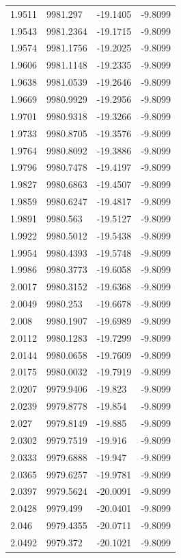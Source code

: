 \begin{table}[H]
\begin{tabular}{llll}
1.9511 & 9981.297 & -19.1405 & -9.8099 \\
1.9543 & 9981.2364 & -19.1715 & -9.8099 \\
1.9574 & 9981.1756 & -19.2025 & -9.8099 \\
1.9606 & 9981.1148 & -19.2335 & -9.8099 \\
1.9638 & 9981.0539 & -19.2646 & -9.8099 \\
1.9669 & 9980.9929 & -19.2956 & -9.8099 \\
1.9701 & 9980.9318 & -19.3266 & -9.8099 \\
1.9733 & 9980.8705 & -19.3576 & -9.8099 \\
1.9764 & 9980.8092 & -19.3886 & -9.8099 \\
1.9796 & 9980.7478 & -19.4197 & -9.8099 \\
1.9827 & 9980.6863 & -19.4507 & -9.8099 \\
1.9859 & 9980.6247 & -19.4817 & -9.8099 \\
1.9891 & 9980.563 & -19.5127 & -9.8099 \\
1.9922 & 9980.5012 & -19.5438 & -9.8099 \\
1.9954 & 9980.4393 & -19.5748 & -9.8099 \\
1.9986 & 9980.3773 & -19.6058 & -9.8099 \\
2.0017 & 9980.3152 & -19.6368 & -9.8099 \\
2.0049 & 9980.253 & -19.6678 & -9.8099 \\
2.008 & 9980.1907 & -19.6989 & -9.8099 \\
2.0112 & 9980.1283 & -19.7299 & -9.8099 \\
2.0144 & 9980.0658 & -19.7609 & -9.8099 \\
2.0175 & 9980.0032 & -19.7919 & -9.8099 \\
2.0207 & 9979.9406 & -19.823 & -9.8099 \\
2.0239 & 9979.8778 & -19.854 & -9.8099 \\
2.027 & 9979.8149 & -19.885 & -9.8099 \\
2.0302 & 9979.7519 & -19.916 & -9.8099 \\
2.0333 & 9979.6888 & -19.947 & -9.8099 \\
2.0365 & 9979.6257 & -19.9781 & -9.8099 \\
2.0397 & 9979.5624 & -20.0091 & -9.8099 \\
2.0428 & 9979.499 & -20.0401 & -9.8099 \\
2.046 & 9979.4355 & -20.0711 & -9.8099 \\
2.0492 & 9979.372 & -20.1021 & -9.8099 \\

\end{tabular}
\end{table}
